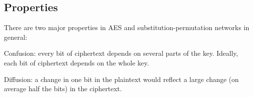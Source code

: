 \documentclass{article}
\begin{document}
\begin{multicols}{2}
\subsection{Properties}

There are two major properties in AES and substitution-permutation networks in general:

Confusion: every bit of ciphertext depends on several parts of the key. Ideally, each bit of ciphertext depends on the whole key.

Diffusion: a change in one bit in the plaintext would reflect a large change (on average half the bits) in the ciphertext.

\end{multicols}
\end{document}
